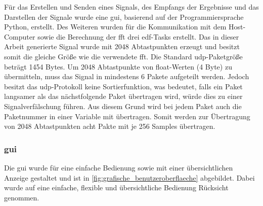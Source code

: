 \documentclass[../EDF Master Thesis.tex]{subfiles}
\begin{document}
        Für das Erstellen und Senden eines Signals, des Empfangs der Ergebnisse und das Darstellen der Signale wurde eine \ac{gui}, basierend auf der Programmiersprache Python, erstellt.
        Des Weiteren wurden für die Kommunikation mit dem Host-Computer sowie die Berechnung der \ac{fft} drei \ac{edf}-Tasks erstellt.
        Das in dieser Arbeit generierte Signal wurde mit 2048 Abtastpunkten erzeugt und besitzt somit die gleiche Größe wie die verwendete \ac{fft}.
        Die Standard \ac{udp}-Paketgröße beträgt 1454 Bytes.
        Um 2048 Abtastpunkte von float-Werten (4 Byte) zu übermitteln, muss das Signal in mindestens 6 Pakete aufgeteilt werden.
        Jedoch besitzt das \ac{udp}-Protokoll keine Sortierfunktion, was bedeutet, falls ein Paket langsamer als das nächstfolgende Paket übertragen wird, würde dies zu einer Signalverfälschung führen.
        Aus diesem Grund wird bei jedem Paket auch die Paketnummer in einer Variable mit übertragen.
        Somit werden zur Übertragung von 2048 Abtastpunkten acht Pakte mit je 256 Samples übertragen.

        \clearpage

        \subsubsection{\acf{gui}}
            Die \ac{gui} wurde für eine einfache Bedienung sowie mit einer übersichtlichen Anzeige gestaltet und ist in \autoref{fig:grafische_benutzeroberflaeche} abgebildet.
            Dabei wurde auf eine einfache, flexible und übersichtliche Bedienung Rücksicht genommen.
\end{document}
